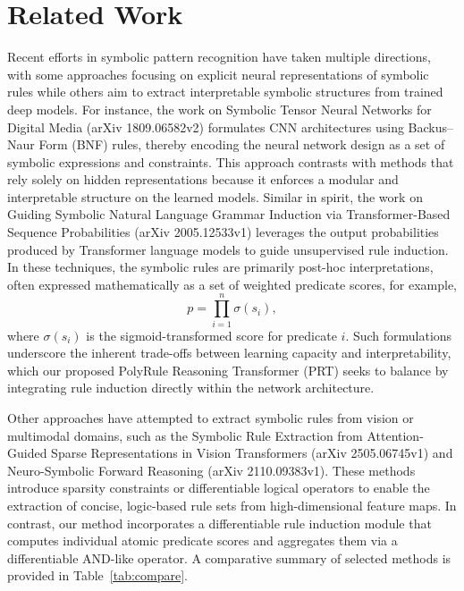 \documentclass{article}
\begin{document}
\section{Related Work}
Recent efforts in symbolic pattern recognition have taken multiple directions, with some approaches focusing on explicit neural representations of symbolic rules while others aim to extract interpretable symbolic structures from trained deep models. For instance, the work on Symbolic Tensor Neural Networks for Digital Media (arXiv 1809.06582v2) formulates CNN architectures using Backus–Naur Form (BNF) rules, thereby encoding the neural network design as a set of symbolic expressions and constraints. This approach contrasts with methods that rely solely on hidden representations because it enforces a modular and interpretable structure on the learned models. Similar in spirit, the work on Guiding Symbolic Natural Language Grammar Induction via Transformer-Based Sequence Probabilities (arXiv 2005.12533v1) leverages the output probabilities produced by Transformer language models to guide unsupervised rule induction. In these techniques, the symbolic rules are primarily post-hoc interpretations, often expressed mathematically as a set of weighted predicate scores, for example, 
\[
p = \prod_{i=1}^{n} \sigma(s_i),
\]
where \( \sigma(s_i) \) is the sigmoid-transformed score for predicate \( i \). Such formulations underscore the inherent trade-offs between learning capacity and interpretability, which our proposed PolyRule Reasoning Transformer (PRT) seeks to balance by integrating rule induction directly within the network architecture.

Other approaches have attempted to extract symbolic rules from vision or multimodal domains, such as the Symbolic Rule Extraction from Attention-Guided Sparse Representations in Vision Transformers (arXiv 2505.06745v1) and Neuro-Symbolic Forward Reasoning (arXiv 2110.09383v1). These methods introduce sparsity constraints or differentiable logical operators to enable the extraction of concise, logic-based rule sets from high-dimensional feature maps. In contrast, our method incorporates a differentiable rule induction module that computes individual atomic predicate scores and aggregates them via a differentiable AND-like operator. A comparative summary of selected methods is provided in Table~\ref{tab:compare}.
\end{document}
